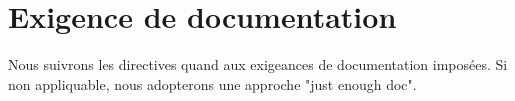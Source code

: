 \documentclass[11pt]{article}
\begin{document}
%
%
%
%
%
\section{Exigence de documentation}
%

Nous suivrons les directives quand aux exigeances de documentation imposées. Si non appliquable, nous adopterons une approche "just enough doc".

%
%
%
%
%
\end{document}
